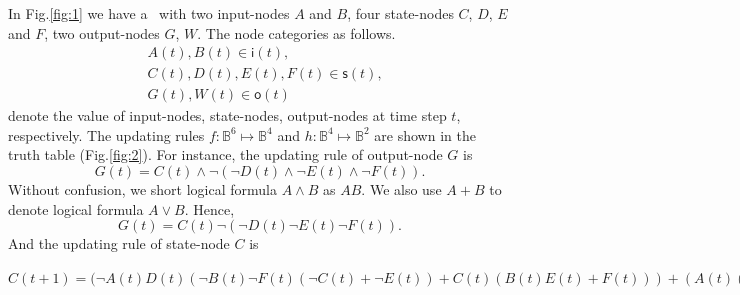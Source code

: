 
\begin{example}
In Fig.\ref{fig:1} we have a \BCN\ with two input-nodes $A$ and $B$, four state-nodes $C$, $D$, $E$ and $F$, two output-nodes $G$, $W$. The node categories  as follows.  
\begin{equation*}
\begin{split}
&A(t), B(t)\in \mathsf{i}(t),\\
&C(t), D(t), E(t), F(t)\in \mathsf{s}(t),\\
&G(t), W(t)\in \mathsf{o}(t)
\end{split}
\label{equ:20}
\end{equation*}
 denote the value of input-nodes, state-nodes, output-nodes at time step $t$, respectively.
The updating rules $f:\mathbb{B}^{6}\mapsto \mathbb{B}^4$ and $h:\mathbb{B}^4\mapsto \mathbb{B}^2$ are shown in the truth table (Fig.\ref{fig:2}).  For instance, the updating rule of output-node $G$ is 
\[G(t)=C(t)\wedge \neg {(\neg {D}(t)\wedge \neg{ E}(t)\wedge \neg{F}(t))}.\]
Without confusion, we short  logical formula $A\wedge B$ as $AB$. We also use $A+B$ to denote logical formula $A\vee B$.  Hence, 
\[G(t)=C(t) \neg {(\neg {D}(t) \neg{ E}(t) \neg{F}(t))}.\]
And the updating rule of state-node $C$ is 

$C(t+1)=(\neg{A}(t)D(t) (\neg{B}(t) \neg{F}(t) (\neg{C}(t) + \neg{E}(t)) + 
C(t)(B(t)E(t)+F(t)))+(A(t)(\neg{D}(t)(\neg{B}(t)\neg{C}(t)+\neg{E}(t)F(t)+
\neg{C}(t)F(t))+B(t)E(t)\neg{F}(t)))+(\neg{B}(t)E(t)(C(t)\neg{D}(t)\neg{F}(t)+
D(t)F(t)))(B(t)\neg{E}(t)(\neg{C}(t)F(t)+C(t)\neg{D}(t))).$


\end{example}
